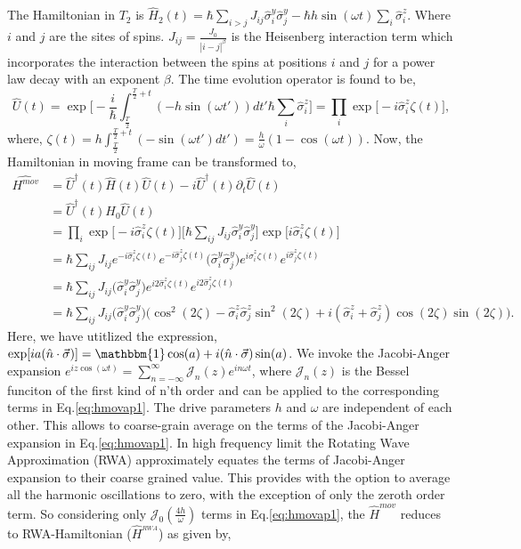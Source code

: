 \documentclass[%
reprint,
superscriptaddress,
amsmath,amssymb,showkeys,
aps,
prb,
]{revtex4-2}
\begin{document}
	The Hamiltonian in $T_2$ is $\displaystyle \hat{H}_2(t) = \hbar\sum_{i>j} J_{ij}\hat{\sigma}^y_i\hat{\sigma}^y_j - \hbar h \sin(\omega t) \sum_i \hat{\sigma}^z_i$.
	Where $i$ and $j$ are the sites of spins. $J_{ij} = \frac{J_0}{|i-j|^\beta}$ is the Heisenberg interaction term which incorporates the interaction between the spins at positions  $i$ and $j$ for a power law decay with an exponent $\beta$. 
	The time evolution operator is found to be,
	\begin{equation}
		\hat{U}(t) = \exp \bigg[-\frac{i}{\hbar}\int_{\frac{T}{2}}^{\frac{T}{2}+t} (-h \sin(\omega t'))dt' \hbar\sum_i\hat{\sigma}^z_i\bigg]
		=\prod_{i} \exp\big[-i \hat{\sigma}^z_i\zeta(t)\big],
	\end{equation}
	where, $\displaystyle \zeta (t) = h\int_{\frac{T}{2}}^{\frac{T}{2}+t}  (-\sin(\omega t')dt') =\frac{h}{\omega}(1-\cos(\omega t))$.
	Now, the Hamiltonian in moving frame can be transformed to\cite{haldar_statistical_2022},
	\begin{align}
		\hat{H^{mov}} &= \hat{U}^\dagger(t) \hat{H}(t) \hat{U}(t)- i \hat{U}^\dagger(t) \partial_t \hat{U}(t) \nonumber\\
		&= \hat{U}^\dagger(t) H_0 \hat{U}(t)\nonumber\\
		&= \prod_{i} \exp\big[-i\hat{\sigma}^z_i \zeta(t)\big] \big[\hbar\sum_{ij}J_{ij}\hat{\sigma}^y_i\hat{\sigma}^y_j\big] \exp\big[ i\hat{\sigma}^z_i \zeta(t)\big]\nonumber\\
		&= \hbar\sum_{ij} J_{ij} e^{-i\hat{\sigma}^z_i \zeta(t)} e^{-i\hat{\sigma}^z_j  \zeta(t)}\Big(\hat{\sigma}^y_i\hat{\sigma}^y_j\Big)e^{i\hat{\sigma}^z_i \zeta(t)} e^{i\hat{\sigma}^z_j \zeta(t)}\nonumber\\
		&= \hbar\sum_{ij} J_{ij} \Big(\hat{\sigma}^y_i\hat{\sigma}^y_j\Big)e^{i2\hat{\sigma}^z_i \zeta(t)} e^{i2\hat{\sigma}^z_j \zeta(t)}\nonumber\\
		&= \hbar\sum_{ij} J_{ij} \Big(\hat{\sigma}^y_i\hat{\sigma}^y_j\Big) \Big(\cos^2(2\zeta) -\hat{\sigma}^z_i\hat{\sigma}^z_j \sin^2(2\zeta) + i (\hat{\sigma}^z_i + \hat{\sigma}^z_j)\cos(2\zeta)\sin(2\zeta)\Big).
		\label{eq:hmovap1}
	\end{align}
	Here, we have utitlized the expression, $\displaystyle \exp[ia(\hat{n}\cdot\vec{\sigma})] = \mathbbm{1} \cos(a) + i (\hat{n}\cdot\vec{\sigma})\sin(a)$.	We invoke the Jacobi-Anger expansion $\displaystyle e^{iz\cos(\omega t)} = \sum_{n=-\infty}^{\infty}\mathcal{J}_n(z)e^{in\omega t}$\cite{arfkenmath}, where $\mathcal{J}_n(z)$ is the Bessel funciton of the first kind of n'th order and can be applied to the corresponding terms in Eq.\eqref{eq:hmovap1}. The drive parameters $h$ and $\omega$ are independent of each other. This allows to coarse-grain average on the terms of the Jacobi-Anger expansion in Eq.\eqref{eq:hmovap1}. In high frequency limit the Rotating Wave Approximation (RWA) approximately equates the terms of Jacobi-Anger expansion to their coarse grained value. This provides with the option to average all the harmonic oscillations to zero, with the exception of only the zeroth order term. So considering only $\mathcal{J}_0\left(\frac{4h}{\omega}\right)$ terms in Eq.\eqref{eq:hmovap1}, the $\hat{H}^{mov}$ reduces to RWA-Hamiltonian ($\hat{H}^{_{RWA}}$) as given by,
\end{document}
